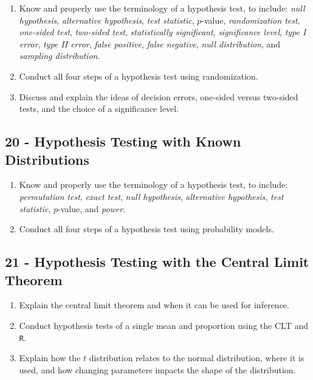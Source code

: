 \documentclass[
  letterpaper,
  DIV=11,
  numbers=noendperiod]{scrreprt}
\begin{document}
\begin{enumerate}
\def\labelenumi{\arabic{enumi})}
\item
  Know and properly use the terminology of a hypothesis test, to
  include: \emph{null hypothesis}, \emph{alternative hypothesis},
  \emph{test statistic}, \(p\)-value, \emph{randomization test},
  \emph{one-sided test}, \emph{two-sided test}, \emph{statistically
  significant}, \emph{significance level}, \emph{type I error},
  \emph{type II error}, \emph{false positive}, \emph{false negative},
  \emph{null distribution}, and \emph{sampling distribution}.
\item
  Conduct all four steps of a hypothesis test using randomization.
\item
  Discuss and explain the ideas of decision errors, one-sided versus
  two-sided tests, and the choice of a significance level.
\end{enumerate}

\subsection*{20 - Hypothesis Testing with Known
Distributions}\label{hypothesis-testing-with-known-distributions}

\begin{enumerate}
\def\labelenumi{\arabic{enumi})}
\item
  Know and properly use the terminology of a hypothesis test, to
  include: \emph{permutation test}, \emph{exact test}, \emph{null
  hypothesis}, \emph{alternative hypothesis}, \emph{test statistic},
  \(p\)-value, and \emph{power}.
\item
  Conduct all four steps of a hypothesis test using probability models.
\end{enumerate}

\subsection*{21 - Hypothesis Testing with the Central Limit
Theorem}\label{hypothesis-testing-with-the-central-limit-theorem}

\begin{enumerate}
\def\labelenumi{\arabic{enumi})}
\item
  Explain the central limit theorem and when it can be used for
  inference.
\item
  Conduct hypothesis tests of a single mean and proportion using the CLT
  and \texttt{R}.
\item
  Explain how the \(t\) distribution relates to the normal distribution,
  where it is used, and how changing parameters impacts the shape of the
  distribution.
\end{enumerate}
\end{document}
